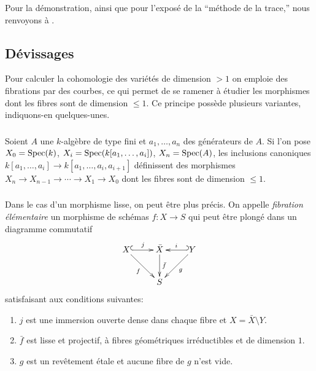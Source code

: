 Pour la démonstration, ainsi que pour l'exposé de la ``méthode de la 
trace,'' nous renvoyons à \cite[IX 5]{sga4}.










\subsection{Dévissages}\label{I:3-4}

Pour calculer la cohomologie des variétés de dimension $>1$ on emploie des 
fibrations par des courbes, ce qui permet de se ramener à étudier les 
morphismes dont les fibres sont de dimension $\leqslant 1$. Ce principe 
possède plusieurs variantes, indiquons-en quelques-unes.





\subsubsection{}\label{I:3-4-1}

Soient $A$ une $k$-algèbre de type fini et $a_1,\dotsc,a_n$ des générateurs de 
$A$. Si l'on pose $X_0=\operatorname{Spec}(k)$, $X_i=\operatorname{Spec}(k[a_1,\dotsc,a_i])$, 
$X_n=\operatorname{Spec}(A)$, les inclusions canoniques 
$k[a_1,\dotsc,a_i]\to k[a_1,\dotsc,a_i,a_{i+1}]$ définissent des morphismes 
$X_n \to X_{n-1} \to \cdots \to X_1 \to X_0$ dont les fibres sont de dimension 
$\leqslant 1$. 





\subsubsection{}\label{I:3-4-2}

Dans le cas d'un morphisme lisse, on peut être plus précis. On appelle 
\emph{fibration élémentaire} un morphisme de schémas $f:X\to S$ qui peut 
être plongé dans un diagramme commutatif
\[\xymatrix{
  X \ar@{^{(}->}[r]^-j \ar[dr]_-f
    & \bar X \ar[d]^-{\bar f}
    & \ar@{_{(}->}[l]_-i \ar[dl]^-g Y \\
  & S
}\]
satisfaisant aux conditions suivantes:
\begin{enumerate}[\indent i)]
  \item $j$ est une immersion ouverte dense dans chaque fibre et 
    $X=\bar X \setminus Y$. 
  \item $\bar f$ est lisse et projectif, à fibres géométriques 
    irréductibles et de dimension $1$.
  \item $g$ est un revêtement étale et aucune fibre de $g$ n'est vide.
\end{enumerate}


